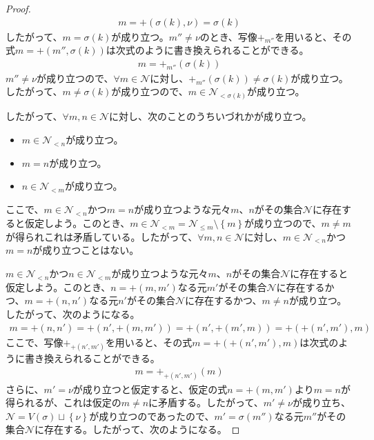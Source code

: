 \documentclass[dvipdfmx]{jsarticle}
\begin{document}
\begin{proof}
\begin{align*}
m = + \left( \sigma(k),\nu \right) = \sigma(k)
\end{align*}
したがって、$m = \sigma(k)$が成り立つ。$m'' \neq \nu$のとき、写像$+_{m''}$を用いると、その式$m = + \left( m'',\sigma(k) \right)$は次式のように書き換えられることができる。
\begin{align*}
m = +_{m''}\left( \sigma(k) \right)
\end{align*}
$m'' \neq \nu$が成り立つので、$\forall m \in \mathcal{N}$に対し、$+_{m''}\left( \sigma(k) \right) \neq \sigma(k)$が成り立つ。したがって、$m \neq \sigma(k)$が成り立つので、$m \in \mathcal{N}_{< \sigma(k)}$が成り立つ。\par
したがって、$\forall m,n \in \mathcal{N}$に対し、次のことのうちいづれかが成り立つ。
\begin{itemize}
\item
  $m \in \mathcal{N}_{< n}$が成り立つ。
\item
  $m = n$が成り立つ。
\item
  $n \in \mathcal{N}_{< m}$が成り立つ。
\end{itemize}\par
ここで、$m \in \mathcal{N}_{< n}$かつ$m = n$が成り立つような元々$m$、$n$がその集合$\mathcal{N}$に存在すると仮定しよう。このとき、$m \in \mathcal{N}_{< m} = \mathcal{N}_{\leq m} \setminus \left\{ m \right\}$が成り立つので、$m \neq m$が得られこれは矛盾している。したがって、$\forall m,n \in \mathcal{N}$に対し、$m \in \mathcal{N}_{< n}$かつ$m = n$が成り立つことはない。\par
$m \in \mathcal{N}_{< n}$かつ$n \in \mathcal{N}_{< m}$が成り立つような元々$m$、$n$がその集合$\mathcal{N}$に存在すると仮定しよう。このとき、$n = + \left( m,m' \right)$なる元$m'$がその集合$\mathcal{N}$に存在するかつ、$m = + \left( n,n' \right)$なる元$n'$がその集合$\mathcal{N}$に存在するかつ、$m \neq n$が成り立つ。したがって、次のようになる。
\begin{align*}
m = + \left( n,n' \right) = + \left( n', + \left( m,m' \right) \right) = + \left( n', + \left( m',m \right) \right) = + \left( + \left( n',m' \right),m \right)
\end{align*}
ここで、写像$+_{+ \left( n',m' \right)}$を用いると、その式$m = + \left( + \left( n',m' \right),m \right)$は次式のように書き換えられることができる。
\begin{align*}
m = +_{+ \left( n',m' \right)}(m)
\end{align*}
さらに、$m' = \nu$が成り立つと仮定すると、仮定の式$n = + \left( m,m' \right)$より$m = n$が得られるが、これは仮定の$m \neq n$に矛盾する。したがって、$m' \neq \nu$が成り立ち、$\mathcal{N} =V(\sigma) \sqcup \left\{ \nu \right\}$が成り立つのであったので、$m' = \sigma\left( m'' \right)$なる元$m''$がその集合$\mathcal{N}$に存在する。したがって、次のようになる。

\end{proof}
\end{document}
